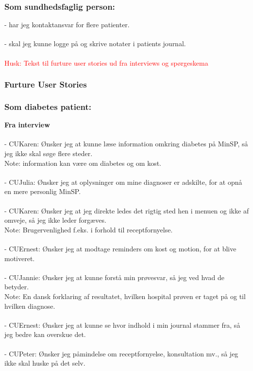 \subsubsection*{Som sundhedsfaglig person:}
- har jeg kontaktansvar for flere patienter.\\
\\
- skal jeg kunne logge på og skrive notater i patients journal.\\
\\
\textcolor{red}{Husk: Tekst til furture user stories ud fra interviews og spørgeskema}
\subsubsection{Furture User Stories}
\subsubsection*{Som diabetes patient:}
\textbf{Fra interview}\\\\
- CUKaren: Ønsker jeg at kunne læse information omkring diabetes på MinSP, så jeg ikke skal søge flere steder. \\
Note: information kan være om diabetes og om kost.\\
\\
- CUJulia: Ønsker jeg at oplysninger om mine diagnoser er adskilte, for at opnå en mere personlig MinSP. \\
\\
- CUKaren: Ønsker jeg at jeg direkte ledes det rigtig sted hen i menuen og ikke af omveje, så jeg ikke leder forgæves.\\ 
Note: Brugervenlighed f.eks. i forhold til receptfornyelse.\\ 
\\
- CUErnest: Ønsker jeg at modtage reminders om kost og motion, for at blive motiveret.\\
\\
- CUJannie: Ønsker jeg at kunne forstå min prøvesvar, så jeg ved hvad de betyder. \\
Note: En dansk forklaring af resultatet, hvilken hospital prøven er taget på og til hvilken diagnose. \\
\\
- CUErnest: Ønsker jeg at kunne se hvor indhold i min journal stammer fra, så jeg bedre kan overskue det.\\
\\
- CUPeter: Ønsker jeg påmindelse om receptfornyelse, konsultation mv., så jeg ikke skal huske på det selv.\\ 
